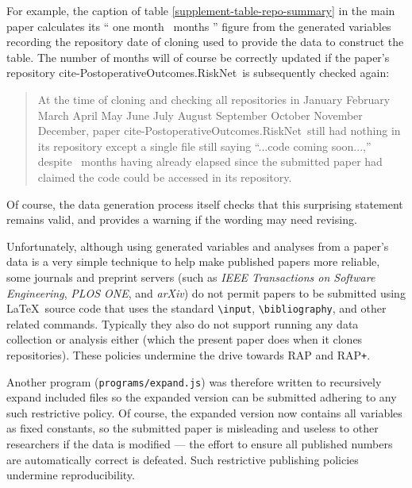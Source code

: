 \documentclass[10pt,a4paper]{article}
\def\plural#1#2{\ifnum #1=1 
	one #2%
\else
	\the#1\ #2s%
\fi}
\def\cloneyear {2023}
\def\clonemonth {05}
\def\monthname#1{\ifcase#1 \or 
January\or 
February\or 
March\or 
April\or 
May\or 
June\or 
July\or 
August\or 
September\or 
October\or 
November\or 
December\fi}
\def\clonewhen{\monthname{\clonemonth} \cloneyear}
\def\RAPstarp#1{RAP{\tt +}#1}
\let\oldbibcite=\bibcite
\def\bibcite#1#2{\global\advance\mainNumberOfReferences by 1\oldbibcite{#1}{#2}}
\let\bibcite=\oldbibcite
\begin{document}
For example, the caption of table \ref{supplement-table-repo-summary} in the main paper calculates its ``\plural{\pubdelayinmonths}{month}'' figure from the generated variables recording the repository date of cloning used to provide the data to construct the table. The number of months will of course be correctly updated if the paper's repository \csname cite-PostoperativeOutcomes.RiskNet\endcsname\ is subsequently checked again:

\begin{quote}
At the time of cloning and checking all repositories in \clonewhen, paper \csname cite-PostoperativeOutcomes.RiskNet\endcsname\ still had nothing in its repository except a single file still saying ``...code coming soon...,'' despite \the\pubdelayinmonths\ months having already elapsed since the submitted paper had claimed the code could be accessed in its repository.\end{quote}

Of course, the data generation process itself checks that this surprising statement remains valid, and provides a warning if the wording may need revising.

Unfortunately, although using generated variables and analyses from a paper's data is a very simple technique to help make published papers more reliable, some journals and preprint servers (such as \emph{IEEE Transactions on Software Engineering}, \emph{PLOS ONE}, and \emph{arXiv\/}) do not permit papers to be submitted using \LaTeX\ source code that uses the standard \texttt{\textbackslash input}, \texttt{\textbackslash bibliography}, and other related commands. Typically they also do not support running any data collection or analysis either (which the present paper does when it clones repositories). These policies undermine the drive towards RAP and \RAPstarp.

Another program (\texttt{programs/expand.js}) was therefore written to recursively expand included files so the expanded version can be submitted adhering to any such restrictive policy. Of course, the expanded version now contains all variables as fixed constants, so the submitted paper is misleading and useless to other researchers if the data is modified --- the effort to ensure all published numbers are automatically correct is defeated. Such restrictive publishing policies undermine reproducibility.

\makeatletter    
    \renewcommand{\bibitem}[2][DEFAULT]{%
    	\if@filesw \immediate\write\@auxout{\string\bibcite{#2}{{{\the\bibciten}{}{{}}{{}}}}}\fi
        \parshape 2 0em \columnwidth \labelwidth \shortercol
        \leavevmode\hbox to \labelwidth{\hfill[\the\bibciten]\hskip 1ex}%
        \global\advance\bibciten by 1
        \ignorespaces 
    }
\makeatother
\end{document}
